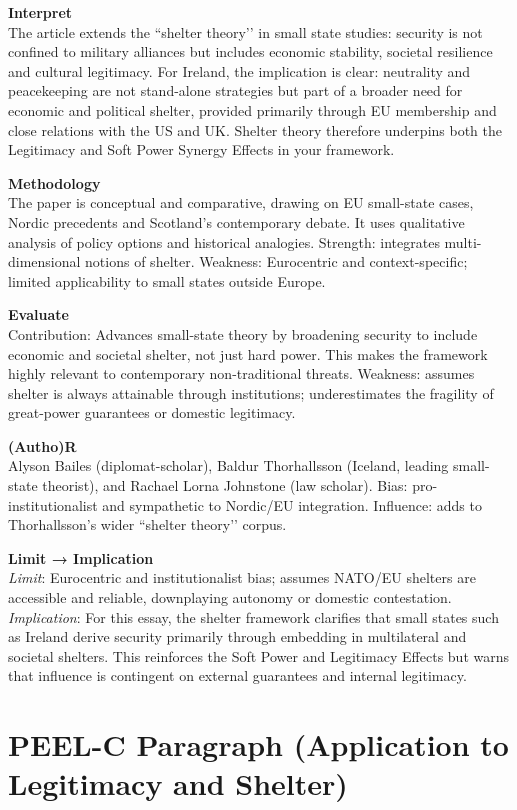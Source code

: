\textbf{Interpret} \\
The article extends the ``shelter theory’’ in small state studies: security is not confined to military alliances but includes economic stability, societal resilience and cultural legitimacy. For Ireland, the implication is clear: neutrality and peacekeeping are not stand-alone strategies but part of a broader need for economic and political shelter, provided primarily through EU membership and close relations with the US and UK. Shelter theory therefore underpins both the Legitimacy and Soft Power Synergy Effects in your framework.

\textbf{Methodology} \\
The paper is conceptual and comparative, drawing on EU small-state cases, Nordic precedents and Scotland’s contemporary debate. It uses qualitative analysis of policy options and historical analogies. Strength: integrates multi-dimensional notions of shelter. Weakness: Eurocentric and context-specific; limited applicability to small states outside Europe.

\textbf{Evaluate} \\
Contribution: Advances small-state theory by broadening security to include economic and societal shelter, not just hard power. This makes the framework highly relevant to contemporary non-traditional threats. Weakness: assumes shelter is always attainable through institutions; underestimates the fragility of great-power guarantees or domestic legitimacy.  

\textbf{(Autho)R} \\
Alyson Bailes (diplomat-scholar), Baldur Thorhallsson (Iceland, leading small-state theorist), and Rachael Lorna Johnstone (law scholar). Bias: pro-institutionalist and sympathetic to Nordic/EU integration. Influence: adds to Thorhallsson’s wider ``shelter theory’’ corpus.

\textbf{Limit → Implication} \\
\textit{Limit}: Eurocentric and institutionalist bias; assumes NATO/EU shelters are accessible and reliable, downplaying autonomy or domestic contestation. \\
\textit{Implication}: For this essay, the shelter framework clarifies that small states such as Ireland derive security primarily through embedding in multilateral and societal shelters. This reinforces the Soft Power and Legitimacy Effects but warns that influence is contingent on external guarantees and internal legitimacy.

\section*{PEEL-C Paragraph (Application to Legitimacy and Shelter)}

